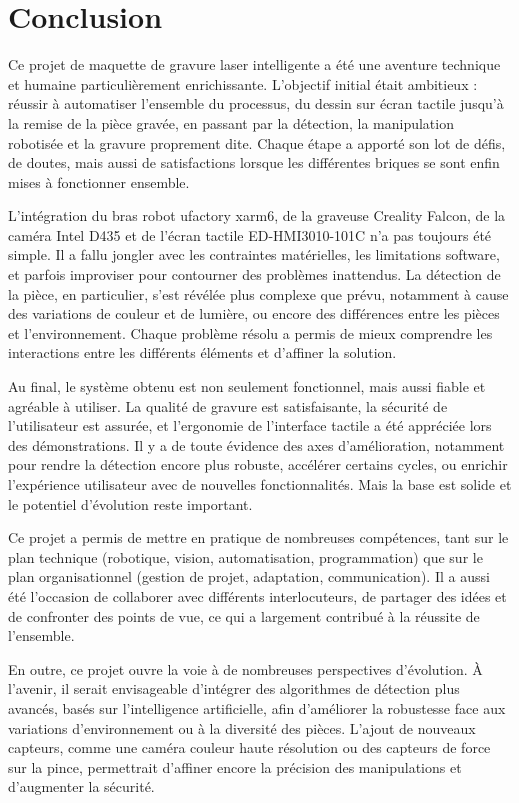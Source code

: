 \chapter{Conclusion}

Ce projet de maquette de gravure laser intelligente a été une aventure technique et humaine particulièrement enrichissante. L'objectif initial était ambitieux : réussir à automatiser l'ensemble du processus, du dessin sur écran tactile jusqu'à la remise de la pièce gravée, en passant par la détection, la manipulation robotisée et la gravure proprement dite. Chaque étape a apporté son lot de défis, de doutes, mais aussi de satisfactions lorsque les différentes briques se sont enfin mises à fonctionner ensemble.

L'intégration du bras robot \gls{ufactory} \gls{xarm6}, de la graveuse Creality Falcon, de la caméra Intel D435 et de l'écran tactile \gls{ED-HMI3010-101C} n'a pas toujours été simple. Il a fallu jongler avec les contraintes matérielles, les limitations \gls{software}, et parfois improviser pour contourner des problèmes inattendus. La détection de la pièce, en particulier, s'est révélée plus complexe que prévu, notamment à cause des variations de couleur et de lumière, ou encore des différences entre les pièces et l'environnement. Chaque problème résolu a permis de mieux comprendre les interactions entre les différents éléments et d'affiner la solution.

Au final, le système obtenu est non seulement fonctionnel, mais aussi fiable et agréable à utiliser. La qualité de gravure est satisfaisante, la sécurité de l'utilisateur est assurée, et l'ergonomie de l'interface tactile a été appréciée lors des démonstrations. Il y a de toute évidence des axes d'amélioration, notamment pour rendre la détection encore plus robuste, accélérer certains cycles, ou enrichir l'expérience utilisateur avec de nouvelles fonctionnalités. Mais la base est solide et le potentiel d’évolution reste important.

Ce projet a permis de mettre en pratique de nombreuses compétences, tant sur le plan technique (robotique, vision, automatisation, programmation) que sur le plan organisationnel (gestion de projet, adaptation, communication). Il a aussi été l'occasion de collaborer avec différents interlocuteurs, de partager des idées et de confronter des points de vue, ce qui a largement contribué à la réussite de l'ensemble.

En outre, ce projet ouvre la voie à de nombreuses perspectives d’évolution. À l’avenir, il serait envisageable d’intégrer des algorithmes de détection plus avancés, basés sur l’intelligence artificielle, afin d’améliorer la robustesse face aux variations d’environnement ou à la diversité des pièces. L’ajout de nouveaux capteurs, comme une caméra couleur haute résolution ou des capteurs de force sur la pince, permettrait d’affiner encore la précision des manipulations et d’augmenter la sécurité.

